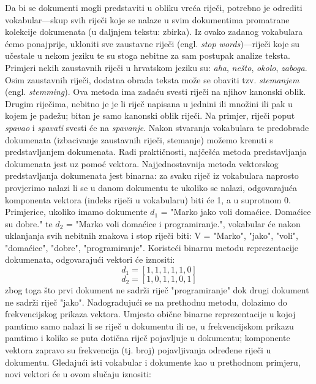 \documentclass[times, utf8, zavrsni]{fer}
\begin{document}
Da bi se dokumenti mogli predstaviti u obliku vreća riječi, potrebno je odrediti vokabular—skup svih riječi koje se nalaze u svim dokumentima promatrane kolekcije dokumenata (u daljnjem tekstu: zbirka). Iz ovako zadanog vokabulara ćemo ponajprije, ukloniti sve zaustavne riječi (engl. \textit{stop words})—riječi koje su učestale u nekom jeziku te su stoga nebitne za sam postupak analize teksta. Primjeri nekih zaustavnih riječi u hrvatskom jeziku su: \textit{aha}, \textit{nešto}, \textit{okolo}, \textit{zaboga}. Osim zaustavnih riječi, dodatna obrada teksta može se obaviti tzv. \textit{stemanjem} (engl. \textit{stemming}). Ova metoda ima zadaću svesti riječi na njihov kanonski oblik. Drugim riječima, nebitno je je li riječ napisana u jednini ili množini ili pak u kojem je padežu; bitan je samo kanonski oblik riječi. Na primjer, riječi poput \textit{spavao} i \textit{spavati} svesti će na \textit{spavanje}.
Nakon stvaranja vokabulara te predobrade dokumenata (izbacivanje zaustavnih riječi, stemanje) možemo krenuti s predstavljanjem dokumenata. Radi praktičnosti, najčešća metoda predstavljanja dokumenata jest uz pomoć vektora.
Najjednostavnija metoda vektorskog predstavljanja dokumenata jest binarna: za svaku riječ iz vokabulara naprosto provjerimo nalazi li se u danom dokumentu te ukoliko se nalazi, odgovarajuća komponenta vektora (indeks riječi u vokabularu) biti će 1, a u suprotnom 0. Primjerice, ukoliko imamo dokumente $d_{1}$ = "Marko jako voli domaćice. Domaćice su dobre." te $d_{2}$ = "Marko voli domaćice i programiranje.", vokabular će nakon uklanjanja svih nebitnih znakova i stop riječi biti: V = {"Marko", "jako", "voli", "domaćice", "dobre", "programiranje"}. Koristeći binarnu metodu reprezentacije dokumenata, odgovarajući vektori će iznositi:
\begin{equation}
{{d_{1}}=[1, 1, 1, 1, 1, 0]}
\end{equation}
\begin{equation}
{{d_{2}}=[1, 0, 1, 1, 0, 1]}
\end{equation}
zbog toga što prvi dokument ne sadrži riječ "programiranje" dok drugi dokument ne sadrži riječ "jako".
Nadograđujući se na prethodnu metodu, dolazimo do frekvencijskog prikaza vektora. Umjesto obične binarne reprezentacije u kojoj pamtimo samo nalazi li se riječ u dokumentu ili ne, u frekvencijskom prikazu pamtimo i koliko se puta dotična riječ pojavljuje u dokumentu; komponente vektora zapravo su frekvencija (tj. broj) pojavljivanja određene riječi u dokumentu. Gledajući isti vokabular i dokumente kao u prethodnom primjeru, novi vektori će u ovom slučaju iznositi:
\end{document}
